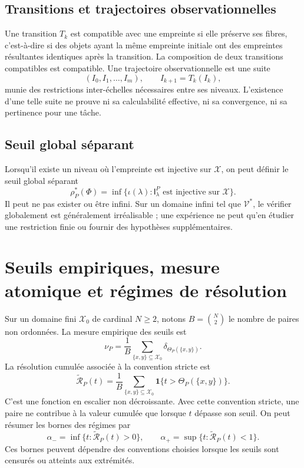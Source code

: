 \documentclass[11pt,a4paper]{article}
\theoremstyle{remark}
\newcommand{\X}{\mathcal X}
\newcommand{\V}{\mathcal V}
\newcommand{\Emp}{\mathsf I}
\newcommand{\one}{\mathbf 1}
\begin{document}
\subsection{Transitions et trajectoires observationnelles}
Une transition $T_k$ est compatible avec une empreinte si elle préserve ses fibres, c'est-à-dire si des objets ayant la même empreinte initiale ont des empreintes résultantes identiques après la transition. La composition de deux transitions compatibles est compatible. Une trajectoire observationnelle est une suite
\[
(I_0,I_1,\ldots,I_m),\qquad I_{k+1}=T_k(I_k),
\]
munie des restrictions inter-échelles nécessaires entre ses niveaux. L'existence d'une telle suite ne prouve ni sa calculabilité effective, ni sa convergence, ni sa pertinence pour une tâche.

\subsection{Seuil global séparant}
Lorsqu'il existe un niveau où l'empreinte est injective sur $\X$, on peut définir le seuil global séparant
\[
\rho_P^*(\Phi)=\inf\{\iota(\lambda):\Emp_\lambda^P\text{ est injective sur }\X\}.
\]
Il peut ne pas exister ou être infini. Sur un domaine infini tel que $\V^*$, le vérifier globalement est généralement irréalisable ; une expérience ne peut qu'en étudier une restriction finie ou fournir des hypothèses supplémentaires.

\section{Seuils empiriques, mesure atomique et régimes de résolution}

Sur un domaine fini $\X_0$ de cardinal $N\geq2$, notons $B=\binom{N}{2}$ le nombre de paires non ordonnées. La mesure empirique des seuils est
\[
\boxed{\nu_P=\frac1B\sum_{\{x,y\}\subseteq\X_0}\delta_{\Theta_P(\{x,y\})}.}
\]
La résolution cumulée associée à la convention stricte est
\[
\boxed{\widetilde{\mathcal R}_P(t)=\frac1B\sum_{\{x,y\}\subseteq\X_0}\one\{t>\Theta_P(\{x,y\})\}.}
\]
C'est une fonction en escalier non décroissante. Avec cette convention stricte, une paire ne contribue à la valeur cumulée que lorsque $t$ dépasse son seuil. On peut résumer les bornes des régimes par
\[
\alpha_- = \inf\{t:\widetilde{\mathcal R}_P(t)>0\},\qquad
\alpha_+ = \sup\{t:\widetilde{\mathcal R}_P(t)<1\}.
\]
Ces bornes peuvent dépendre des conventions choisies lorsque les seuils sont censurés ou atteints aux extrémités.
\end{document}
